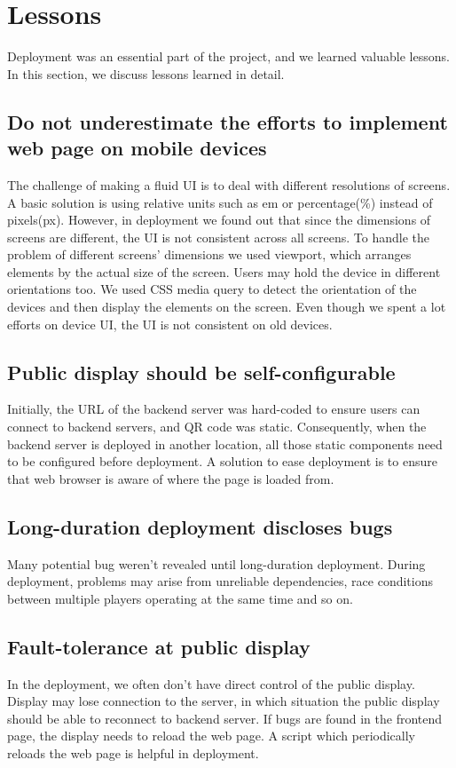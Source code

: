 \documentclass{sig-alternate}
\begin{document}
\section{Lessons}

Deployment was an essential part of the project\cite{storz:deployment_lessons}, and we learned valuable lessons.
In this section, we discuss lessons learned in detail.

\subsection{Do not underestimate the efforts to implement web page on mobile devices}
The challenge of making a fluid UI is to deal with different resolutions of 
screens. A basic solution is using relative units such as em or percentage(\%) 
instead of pixels(px). However, in deployment we found out that since the 
dimensions of screens are different, the UI is not consistent across 
all screens. To handle the problem of different screens' dimensions we used 
viewport, which arranges elements by the actual size of the screen. Users 
may hold the device in different orientations too. We used CSS media query 
to detect the orientation of the devices and then display the elements on
 the screen. Even though we spent a lot efforts on device UI, the UI is not 
 consistent on old devices.
 
\subsection{Public display should be self-configurable}
Initially, the URL of the backend 
server was hard-coded to ensure users can connect to backend servers, and QR code was static. Consequently, when the backend server is 
deployed in another location, all those static components need to be configured 
before deployment. A solution to ease deployment is to ensure 
that web browser is aware of where the page is loaded from.

\subsection{Long-duration deployment discloses bugs}
Many potential bug weren't revealed until 
long-duration deployment. During deployment, problems may arise from 
unreliable dependencies, race conditions between multiple players operating 
at the same time and so on.

\subsection{Fault-tolerance at public display}
In the deployment, we often don't have
direct control of the public display. Display may lose connection to
the server, in which situation the public display should be able to reconnect to 
backend server. If bugs are found in the frontend page, the display needs to 
reload the web page. A script which periodically reloads the web page is helpful 
in deployment.
\end{document}
